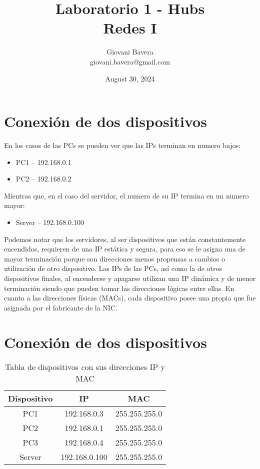 \documentclass{article}
\title{Laboratorio 1 - Hubs \\ Redes I}
\author{Giovani Bavera \\ giovani.bavera@gmail.com}
\date{August 30, 2024}
\begin{document}
\maketitle

\section{Conexión de dos dispositivos}

En los casos de las PCs se pueden ver que las IPs terminan en numero bajos:

\begin{itemize}
    \item PC1 -- 192.168.0.1
    \item PC2 -- 192.168.0.2
\end{itemize}

Mientras que, en el caso del servidor, el numero de su IP termina en un numero mayor: 

\begin{itemize}
    \item Server -- 192.168.0.100
\end{itemize}

Podemos notar que los servidores, al ser dispositivos que están constantemente encendidos, requieren de una IP estática y segura, para eso se le asigna una de mayor terminación porque son direcciones menos propensas a cambios o utilización de otro dispositivo. Las IPs de las PCs, así como la de otros dispositivos finales, al encenderse y apagarse utilizan una IP dinámica y de menor terminación siendo que pueden tomar las direcciones lógicas entre ellas. 
En cuanto a las direcciones físicas (MACs), cada dispositivo posee una propia que fue asignada por el fabricante de la NIC.

\section{Conexión de dos dispositivos}

\begin{table}[h]
    \centering
    \begin{tabular}{|c|c|c|}
        \hline
        \textbf{Dispositivo} & \textbf{IP} & \textbf{MAC} \\
        \hline
        PC1 & 192.168.0.3 & 255.255.255.0 \\
        \hline
        PC2 & 192.168.0.1 & 255.255.255.0 \\
        \hline
        PC3 & 192.168.0.4 & 255.255.255.0 \\
        \hline
        Server & 192.168.0.100 & 255.255.255.0 \\
        \hline
    \end{tabular}
    \caption{Tabla de dispositivos con sus direcciones IP y MAC}
    \label{tab:devices}
\end{table}
\end{document}
